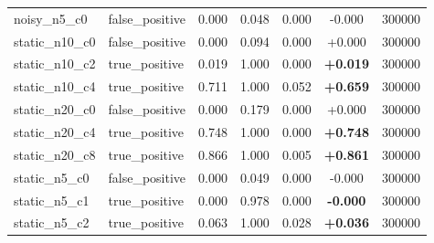 \begin{table}[h]
\begin{tabular}{llccccc}
noisy\_n5\_c0 & false\_positive & 0.000 & 0.048 & 0.000 & -0.000 & 300000 \\
static\_n10\_c0 & false\_positive & 0.000 & 0.094 & 0.000 & +0.000 & 300000 \\
static\_n10\_c2 & true\_positive & 0.019 & 1.000 & 0.000 & \textbf{+0.019} & 300000 \\
static\_n10\_c4 & true\_positive & 0.711 & 1.000 & 0.052 & \textbf{+0.659} & 300000 \\
static\_n20\_c0 & false\_positive & 0.000 & 0.179 & 0.000 & +0.000 & 300000 \\
static\_n20\_c4 & true\_positive & 0.748 & 1.000 & 0.000 & \textbf{+0.748} & 300000 \\
static\_n20\_c8 & true\_positive & 0.866 & 1.000 & 0.005 & \textbf{+0.861} & 300000 \\
static\_n5\_c0 & false\_positive & 0.000 & 0.049 & 0.000 & -0.000 & 300000 \\
static\_n5\_c1 & true\_positive & 0.000 & 0.978 & 0.000 & \textbf{-0.000} & 300000 \\
static\_n5\_c2 & true\_positive & 0.063 & 1.000 & 0.028 & \textbf{+0.036} & 300000 \\
\bottomrule
\end{tabular}
\end{table}